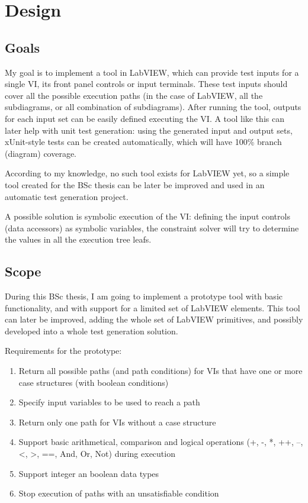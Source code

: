 \chapter{Design}
\section{Goals}
My goal is to implement a tool in LabVIEW, which can provide test inputs for a single VI, its front panel controls or input terminals. These test inputs should cover all the possible execution paths (in the case of LabVIEW, all the subdiagrams, or all combination of subdiagrams). After running the tool, outputs for each input set can be easily defined executing the VI. A tool like this can later help with unit test generation: using the generated input and output sets, xUnit-style tests can be created automatically, which will have 100\% branch (diagram) coverage.

According to my knowledge, no such tool exists for LabVIEW yet, so a simple tool created for the BSc thesis can be later be improved and used in an automatic test generation project.

A possible solution is symbolic execution of the VI: defining the input controls (data accessors) as symbolic variables, the constraint solver will try to determine the values in all the execution tree leafs.
\section{Scope}
During this BSc thesis, I am going to implement a prototype tool with basic functionality, and with support for a limited set of LabVIEW elements. This tool can later be improved, adding the whole set of LabVIEW primitives, and possibly developed into a whole test generation solution. 

Requirements for the prototype:
\begin{enumerate}
\item Return all possible paths (and path conditions) for VIs that have one or more case structures (with boolean conditions)
\item Specify input variables to be used to reach a path
\item Return only one path for VIs without a case structure
\item Support basic arithmetical, comparison and logical operations (+, -, *, ++, --, <, >, ==, And, Or, Not) during execution
\item Support integer an boolean data types
\item Stop execution of paths with an unsatisfiable condition
\end{enumerate}

